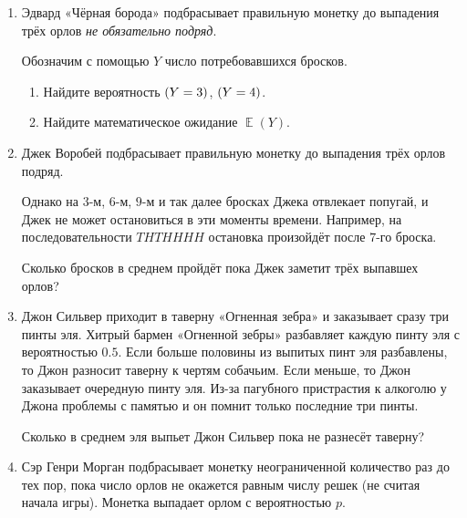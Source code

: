 \documentclass[12pt]{article}
\let\P\relax
\DeclareMathOperator{\P}{\mathbb{P}}
\DeclareMathOperator{\E}{\mathbb{E}}
\newcommand{\addtag}[1]{\index{#1}}
\begin{document}
\begin{enumerate}
    \item Эдвард «Чёрная борода» \raisebox{-3pt}{\begin{tikzpicture}[scale=0.3]
    \duck[
        cape=black,
        hat=black,
        mask=black
    ]
    \end{tikzpicture}} подбрасывает правильную монетку до выпадения трёх орлов \emph{не обязательно подряд}. 

    Обозначим с помощью $Y$ число потребовавшихся бросков. 

    \begin{enumerate}
        \item Найдите вероятность $\P(Y = 3)$, $\P(Y = 4)$.
        \item Найдите математическое ожидание $\E(Y)$.
    \end{enumerate}

    \item Джек Воробей \raisebox{-3pt}{\begin{tikzpicture}[scale=0.3]
    \duck[
        cape=black,
        hat=black,
        mask=black
    ]
    \end{tikzpicture}} подбрасывает правильную монетку до выпадения трёх орлов подряд. 
    
    Однако на $3$-м, $6$-м, $9$-м и так далее бросках Джека отвлекает попугай, и Джек не может остановиться в эти моменты времени.
    Например, на последовательности $THTHHHH$ остановка произойдёт после $7$-го броска. 

    Сколько бросков в среднем пройдёт пока Джек заметит трёх выпавшех орлов?

    \item Джон Сильвер  \raisebox{-3pt}{\begin{tikzpicture}[scale=0.3]
    \duck[
        cape=black,
        hat=black,
        mask=black
    ]
    \end{tikzpicture}} приходит в таверну «Огненная зебра» и заказывает сразу три пинты эля. 
    Хитрый бармен «Огненной зебры» разбавляет каждую пинту эля с вероятностью $0.5$. 
    Если больше половины из выпитых пинт эля разбавлены, то Джон разносит таверну к чертям собачьим. 
    Если меньше, то Джон заказывает очередную пинту эля. 
    Из-за пагубного пристрастия к алкоголю у Джона проблемы с памятью и он помнит только последние три пинты. 

    Сколько в среднем эля выпьет Джон Сильвер пока не разнесёт таверну?

    \item Сэр Генри Морган \raisebox{-3pt}{\begin{tikzpicture}[scale=0.3]
    \duck[
        cape=black,
        hat=black,
        mask=black
    ]
    \end{tikzpicture}} подбрасывает монетку\addtag{монетка} 
 неограниченной количество раз до тех пор, пока число орлов не окажется равным числу решек (не считая начала игры).
    Монетка\addtag{монетка} выпадает орлом с вероятностью $p$.


\end{enumerate}
\end{document}
